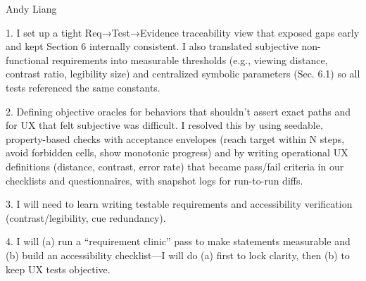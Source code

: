 \documentclass[12pt, titlepage]{article}
\begin{document}
Andy Liang

1. I set up a tight Req→Test→Evidence traceability view that exposed gaps early and kept Section 6 internally consistent. I also translated subjective non-functional requirements into measurable thresholds (e.g., viewing distance, contrast ratio, legibility size) and centralized symbolic parameters (Sec. 6.1) so all tests referenced the same constants.

2. Defining objective oracles for behaviors that shouldn’t assert exact paths and for UX that felt subjective was difficult. I resolved this by using seedable, property-based checks with acceptance envelopes (reach target within N steps, avoid forbidden cells, show monotonic progress) and by writing operational UX definitions (distance, contrast, error rate) that became pass/fail criteria in our checklists and questionnaires, with snapshot logs for run-to-run diffs.

3. I will need to learn writing testable requirements and accessibility verification (contrast/legibility, cue redundancy).

4. I will (a) run a “requirement clinic” pass to make statements measurable and (b) build an accessibility checklist—I will do (a) first to lock clarity, then (b) to keep UX tests objective.
\end{document}
